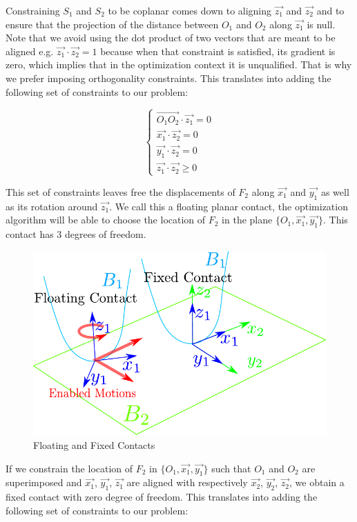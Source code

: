 Constraining $S_1$ and $S_2$ to be coplanar comes down to aligning $\vec{z_1}$ and $\vec{z_2}$ and to ensure that the projection of the distance between $O_1$ and $O_2$ along $\vec{z_1}$ is null.
Note that we avoid using the dot product of two vectors that are meant to be aligned e.g. $\vec{z_1}\cdot\vec{z_2} = 1$ because when that constraint is satisfied, its gradient is zero, which implies that in the optimization context it is unqualified.
That is why we prefer imposing orthogonality constraints.
This translates into adding the following set of constraints to our problem:

\begin{equation}
\label{eq:coplanarity}
\boxed{\left\{
  \begin{array}{l}
    \overrightarrow{O_1O_2} \cdot \vec{z_1} = 0\\
    \vec{x_1}\cdot\vec{z_2} = 0\\
    \vec{y_1}\cdot\vec{z_2} = 0\\
    \vec{z_1}\cdot\vec{z_2} \geq 0
  \end{array}
  \right.}
\end{equation}

This set of constraints leaves free the displacements of $F_2$ along $\vec{x_1}$ and $\vec{y_1}$ as well as its rotation around $\vec{z_1}$.
We call this a floating planar contact, the optimization algorithm will be able to choose the location of $F_2$ in the plane $\{O_1, \vec{x_1}, \vec{y_1}\}$.
This contact has 3 degrees of freedom.

\begin{figure}[htpb]
  \centering
  \includegraphics[width=0.8\linewidth]{contactConstraint.pdf}
  \caption{Floating and Fixed Contacts}
\label{fig:contactConstraint}
\end{figure}

If we constrain the location of $F_2$ in $\{O_1, \vec{x_1}, \vec{y_1}\}$ such that $O_1$ and $O_2$ are superimposed and $\vec{x_1}$, $\vec{y_1}$, $\vec{z_1}$ are aligned with respectively $\vec{x_2}$, $\vec{y_2}$, $\vec{z_2}$, we obtain a fixed contact with zero degree of freedom.
This translates into adding the following set of constraints to our problem:

